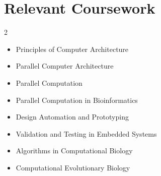 \documentclass[letterpaper,11pt]{article}
\newcommand{\resumeSubHeadingListStart}{\begin{itemize}[leftmargin=0.0in, label={}]}
\newcommand{\resumeSubHeadingListEnd}{\end{itemize}}
\begin{document}
\section{Relevant Coursework}
        \begin{multicols}{2}
            \begin{itemize}[itemsep=-1pt, parsep=3pt]
                \item Principles of Computer Architecture
                \item Parallel Computer Architecture
                \item Parallel Computation
                \item Parallel Computation in Bioinformatics
                \item Design Automation and Prototyping
                \item Validation and Testing in Embedded Systems
                \item Algorithms in Computational Biology
                \item Computational Evolutionary Biology
            \end{itemize}
        \end{multicols}
        \vspace*{2.0\multicolsep}
\end{document}
